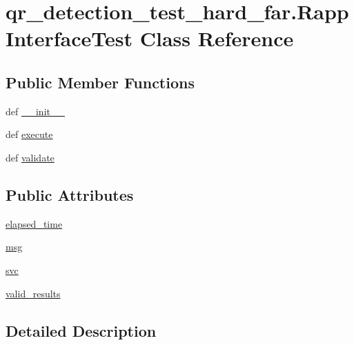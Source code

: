 \hypertarget{classqr__detection__test__hard__far_1_1RappInterfaceTest}{\section{qr\-\_\-detection\-\_\-test\-\_\-hard\-\_\-far.\-Rapp\-Interface\-Test Class Reference}
\label{classqr__detection__test__hard__far_1_1RappInterfaceTest}
}
\subsection*{Public Member Functions}
\begin{DoxyCompactItemize}
\item 
def \hyperlink{classqr__detection__test__hard__far_1_1RappInterfaceTest_afbf6c99bb431cd6f2e1e544010ad1987}{\-\_\-\-\_\-init\-\_\-\-\_\-}
\item 
def \hyperlink{classqr__detection__test__hard__far_1_1RappInterfaceTest_ab88c932d244284701a14b0aeb4cea0cf}{execute}
\item 
def \hyperlink{classqr__detection__test__hard__far_1_1RappInterfaceTest_ad15793fc354a8d5b766967e0554ef5f3}{validate}
\end{DoxyCompactItemize}
\subsection*{Public Attributes}
\begin{DoxyCompactItemize}
\item 
\hyperlink{classqr__detection__test__hard__far_1_1RappInterfaceTest_aa412f24e41f5bd5624e2d277bf5cb05a}{elapsed\-\_\-time}
\item 
\hyperlink{classqr__detection__test__hard__far_1_1RappInterfaceTest_a49b30e7a5a9fed9f814bfcc3c56e1a6a}{msg}
\item 
\hyperlink{classqr__detection__test__hard__far_1_1RappInterfaceTest_a24016b019d6f2c673448e3426f4280d7}{svc}
\item 
\hyperlink{classqr__detection__test__hard__far_1_1RappInterfaceTest_a44db7218c1139d16a3eaeb95e43f89c1}{valid\-\_\-results}
\end{DoxyCompactItemize}


\subsection{Detailed Description}


